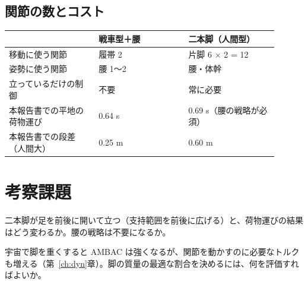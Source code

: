 \subsection{関節の数とコスト}

\begin{longtable}{p{0.30\linewidth}p{0.30\linewidth}p{0.30\linewidth}}
\toprule
& 戦車型＋腰 & 二本脚（人間型） \\ \midrule \endhead
移動に使う関節 & 履帯 2 & 片脚 6 × 2 = 12 \\
姿勢に使う関節 & 腰 1〜2 & 腰・体幹 \\
立っているだけの制御 & 不要 & 常に必要 \\
本報告書での平地の荷物運び & 0.64 s & 0.69 s（腰の戦略が必須） \\
本報告書での段差（人間大） & 0.25 m & 0.60 m \\
\bottomrule
\end{longtable}

\section*{考察課題}
\begin{exercise}
二本脚が足を前後に開いて立つ（支持範囲を前後に広げる）と、荷物運びの結果はどう変わるか。腰の戦略は不要になるか。
\end{exercise}
\begin{exercise}
宇宙で脚を重くすると AMBAC は強くなるが、関節を動かすのに必要なトルクも増える（第~\ref{ch:dyn}章）。脚の質量の最適な割合を決めるには、何を評価すればよいか。
\end{exercise}
